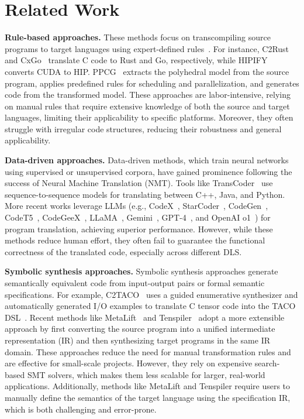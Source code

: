 
\section{Related Work}




\textbf{Rule-based approaches.}
These methods focus on transcompiling source programs to target languages using expert-defined rules~\cite{C2Rust, cxgo, HIPIFY, 10.1145/2400682.2400713}. For instance, C2Rust~\cite{C2Rust} and CxGo~\cite{cxgo} translate C code to Rust and Go, respectively, while HIPIFY~\cite{HIPIFY} converts CUDA to HIP. PPCG~\cite{10.1145/2400682.2400713} extracts the polyhedral model from the source program, applies predefined rules for scheduling and parallelization, and generates code from the transformed model.
These approaches are labor-intensive, relying on manual rules that require extensive knowledge of both the source and target languages, limiting their applicability to specific platforms. Moreover, they often struggle with irregular code structures, reducing their robustness and general applicability.

\textbf{Data-driven approaches.}
Data-driven methods, which train neural networks using supervised or unsupervised corpora, have gained prominence following the success of Neural Machine Translation (NMT). Tools like TransCoder~\cite{Roziere20NIPS} use sequence-to-sequence models for translating between C++, Java, and Python.
More recent works leverage LLMs (e.g., CodeX~\cite{chen2021evaluating}, StarCoder~\cite{li2023starcoder}, CodeGen~\cite{nijkamp2022codegen}, CodeT5~\cite{wang2021codet5}, CodeGeeX~\cite{zheng2023codegeex}, LLaMA~\cite{touvron2023llama}, Gemini~\cite{team2023gemini}, GPT-4~\cite{achiam2023gpt}, and OpenAI o1~\cite{openaio1}) for program translation, achieving superior performance.
However, while these methods reduce human effort, they often fail to guarantee the functional correctness of the translated code, especially across different DLS.

\textbf{Symbolic synthesis approaches.}
Symbolic synthesis approaches generate semantically equivalent code from input-output pairs or formal semantic specifications. For example, C2TACO~\cite{magalhaes2023c2taco} uses a guided enumerative synthesizer and automatically generated I/O examples to translate C tensor code into the TACO DSL~\cite{kjolstad2017taco}. Recent methods like MetaLift~\cite{bhatia_et_al:LIPIcs.ECOOP.2023.38} and Tenspiler~\cite{DBLP:conf/ecoop/QiuCBHSC24} adopt a more extensible approach by first converting the source program into a unified intermediate representation (IR) and then synthesizing target programs in the same IR domain.
These approaches reduce the need for manual transformation rules and are effective for small-scale projects. However, they rely on expensive search-based SMT solvers, which makes them less scalable for larger, real-world applications. Additionally, methods like MetaLift and Tenspiler require users to manually define the semantics of the target language using the specification IR, which is both challenging and error-prone.


